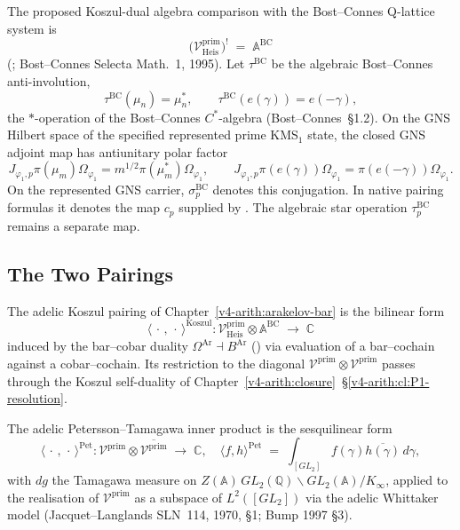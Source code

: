 The proposed Koszul-dual algebra comparison with the
Bost--Connes Q-lattice system is
\begin{equation}
\bigl(\mathcal{V}^{\mathrm{prim}}_{\mathrm{Heis}}\bigr)^{!}
\;=\;\mathbb{A}^{\mathrm{BC}}
\end{equation}
(; Bost--Connes Selecta
Math.~1, 1995). Let \(\tau^{\mathrm{BC}}\) be the algebraic
Bost--Connes anti-involution,
\[
\tau^{\mathrm{BC}}(\mu_{n})=\mu_{n}^{*},\qquad
\tau^{\mathrm{BC}}(e(\gamma))=e(-\gamma),
\]
the \(*\)-operation of the Bost--Connes \(C^{*}\)-algebra
(Bost--Connes~\S1.2). On the GNS Hilbert space of the
specified represented prime KMS\({}_{1}\) state, the closed
GNS adjoint map has antiunitary polar factor
\[
J_{\varphi_{1},p}\pi(\mu_m)\Omega_{\varphi_{1}}
=m^{1/2}\pi(\mu_m^{*})\Omega_{\varphi_{1}},\qquad
J_{\varphi_{1},p}\pi(e(\gamma))\Omega_{\varphi_{1}}
=\pi(e(-\gamma))\Omega_{\varphi_{1}} .
\]
On the represented GNS carrier, \(\sigma^{\mathrm{BC}}_p\)
denotes this conjugation. In native pairing formulas it denotes
the map \(c_p\) supplied by
. The algebraic
star operation \(\tau^{\mathrm{BC}}_p\) remains a separate map.

\subsection{The Two Pairings}
\label{v4-arith:kp:two-pairings}

The adelic Koszul pairing of Chapter~\ref{v4-arith:arakelov-bar}
is the bilinear form
\begin{equation}
\label{v4-arith:kp:eq:Koszul-pairing-def}
\langle\,\cdot\,,\,\cdot\,\rangle^{\mathrm{Koszul}}\colon
\mathcal{V}^{\mathrm{prim}}_{\mathrm{Heis}}\otimes\mathbb{A}^{\mathrm{BC}}\;\longrightarrow\;\mathbb{C}
\end{equation}
induced by the bar--cobar duality
\(\Omega^{\mathrm{Ar}}\dashv B^{\mathrm{Ar}}\)
() via evaluation of a
bar--cochain against a cobar--cochain. Its restriction to the
diagonal \(\mathcal{V}^{\mathrm{prim}}\otimes\mathcal{V}^{\mathrm{prim}}\)
passes through the Koszul self-duality of
Chapter~\ref{v4-arith:closure}~\S\ref{v4-arith:cl:P1-resolution}.

The adelic Petersson--Tamagawa inner product is the sesquilinear
form
\begin{equation}
\label{v4-arith:kp:eq:Pet-pairing-def}
\langle\,\cdot\,,\,\cdot\,\rangle^{\mathrm{Pet}}
\colon\mathcal{V}^{\mathrm{prim}}\otimes\overline{\mathcal{V}^{\mathrm{prim}}}\;\longrightarrow\;\mathbb{C},
\quad
\langle f,h\rangle^{\mathrm{Pet}}
\;=\;\int_{[GL_{2}]}f(\gamma)\overline{h(\gamma)}\,d\gamma,
\end{equation}
with \(dg\) the Tamagawa measure on
\(Z(\mathbb{A})\,GL_{2}(\mathbb{Q})\backslash GL_{2}(\mathbb{A})/K_{\infty}\),
applied to the realisation of \(\mathcal{V}^{\mathrm{prim}}\) as
a subspace of \(L^{2}([GL_{2}])\) via the adelic Whittaker model
(Jacquet--Langlands SLN~114, 1970, \S1; Bump 1997 \S3).

